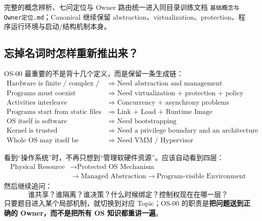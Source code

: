 \documentclass[11pt,a4paper]{ctexart}
\newcommand{\kw}[1]{\textbf{#1}}
\begin{document}
完整的概念辨析、七问定位与 Owner 路由统一进入同目录训练文档 \texttt{基础概念与Owner定位.md}；Canonical 继续保留 abstraction、virtualization、protection、程序运行环境与启动/结构机制本身。

\subsection{忘掉名词时怎样重新推出来？}

OS-00 最重要的不是背十几个定义，而是保留一条生成链：
\[
\boxed{
\begin{aligned}
\text{Hardware is finite / complex / shared}\;&\Rightarrow\;\text{Need abstraction and management}\\
\text{Programs must coexist}\;&\Rightarrow\;\text{Need virtualization + protection + policy}\\
\text{Activities interleave}\;&\Rightarrow\;\text{Concurrency + asynchrony problems}\\
\text{Programs start from static files}\;&\Rightarrow\;\text{Link + Load + Runtime Image}\\
\text{OS itself is software}\;&\Rightarrow\;\text{Need bootstrapping}\\
\text{Kernel is trusted}\;&\Rightarrow\;\text{Need a privilege boundary and an architecture choice}\\
\text{Whole OS may itself be virtualized}\;&\Rightarrow\;\text{Need VMM / Hypervisor}
\end{aligned}
}
\]

\begin{corebox}[本册最终心智模型]
看到“操作系统”时，不再只想到“管理软硬件资源”。应该自动看到四层：
\[
\boxed{
\begin{aligned}
\text{Physical Resource}
&\rightarrow \text{Protected OS Mechanism}\\
&\rightarrow \text{Managed Abstraction}
\rightarrow \text{Program-visible Environment}
\end{aligned}
}
\]
然后继续追问：
\[
\boxed{\text{谁共享？谁隔离？谁决策？什么时候绑定？控制权现在在哪一层？}}
\]
只要题目进入某个局部机制，就切换到对应 Topic；OS-00 的职责是\kw{把问题送到正确的 Owner，而不是把所有 OS 知识都重讲一遍}。
\end{corebox}
\end{document}
